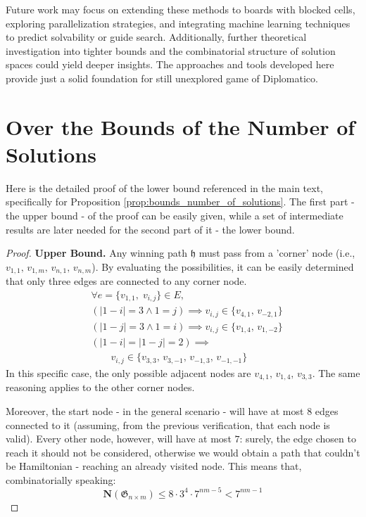 \documentclass[conference]{IEEEtran}
\begin{document}
Future work may focus on extending these methods to boards with blocked cells, exploring parallelization strategies, and integrating machine learning techniques to predict solvability or guide search. Additionally, further theoretical investigation into tighter bounds and the combinatorial structure of solution spaces could yield deeper insights. The approaches and tools developed here provide just a solid foundation for still unexplored game of Diplomatico.




\newpage
\appendices
\section{Over the Bounds of the Number of Solutions} 	\label{appendix:proof_bound}
Here is the detailed proof of the lower bound referenced in the main text, specifically for Proposition \ref{prop:bounds_number_of_solutions}.
The first part - the upper bound - of the proof can be easily given, while a set of intermediate results are later needed for the second part of it - the lower bound.
\vspace{0.6em}
\begin{proof}
	\textbf{Upper Bound.} 
	Any winning path $\mathfrak{h}$ must pass from a 'corner' node (i.e., $v_{1,1},\,v_{1,m},\,v_{n,1},\,v_{n,m}$). By evaluating the possibilities, it can be easily determined that only three edges are connected to any corner node.
	\begin{align*}
		&\forall e = \{v_{1,1},\;v_{i,j}\} \in E, \\
		&(|1 - i| = 3 \land 1 = j) \implies v_{i,j} \in \{v_{4,1},\,v_{-2,1}\} \\
		&(|1 - j| = 3 \land 1 = i) \implies v_{i,j} \in \{v_{1,4},\,v_{1,-2}\} \\
		&(|1 - i| = |1 - j| = 2) \implies \\
		&\quad\quad v_{i,j} \in \{v_{3,3},\,v_{3,-1},\,v_{-1,3},\,v_{-1,-1}\}
	\end{align*}
	In this specific case, the only possible adjacent nodes are $v_{4,1},\,v_{1,4},\,v_{3,3}$. The same reasoning applies to the other corner nodes.
	
	Moreover, the start node - in the general scenario - will have at most $8$ edges connected to it (assuming, from the previous verification, that each node is valid). Every other node, however, will have at most $7$: surely, the edge chosen to reach it should not be considered, otherwise we would obtain a path that couldn't be Hamiltonian - reaching an already visited node.
	This means that, combinatorially speaking:
	$$
	\mathbf{N}(\mathfrak{G}_{n \times m}) \leq 8 \cdot 3^4 \cdot 7^{nm - 5} < 7^{nm - 1}
	$$
\end{proof}
\end{document}
